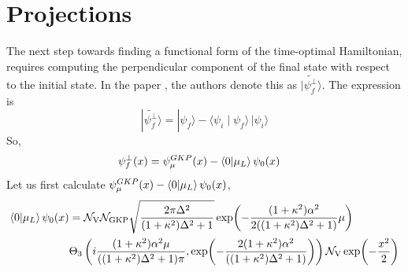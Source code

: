 \documentclass[11pt]{article}
\begin{document}
\section{Projections}
The next step towards finding a functional form of the time-optimal Hamiltonian, requires computing the perpendicular component of the final state with respect to the initial state. In the paper \cite{yang2022MinimumTime}, the authors denote this as $|\tilde{\psi_f^{\perp}}\rangle$. The expression is
\[
    |\tilde{\psi_f^{\perp}}\rangle
    =
    |\psi_f\rangle
    -
    \langle \psi_i \mid \psi_f \rangle \, |\psi_i\rangle
\]
So,
\begin{align*}
    \psi_f^{\perp}(x) & = \psi_{\mu}^{GKP}(x) - \braket{0}{\mu_L} \psi_0(x)
\end{align*}
Let us first calculate $\psi_{\mu}^{GKP}(x) - \braket{0}{\mu_L} \psi_0(x)$,
\begin{align*}
    \braket{0}{\mu_L} \psi_0(x)
     & =
    \mathcal{N}_{\mathrm{V}} \mathcal{N}_{\mathrm{GKP}} \sqrt{\frac{2\pi\Delta^2}{(1 + \kappa^2)\Delta^2 + 1}}  \exp\!\left(-\frac{(1 + \kappa^2)\alpha^2}{2((1 + \kappa^2)\Delta^2 + 1)} \mu\right) \\ &\Theta_3\left(i\frac{(1 + \kappa^2)\alpha^2 \mu}{((1 + \kappa^2)\Delta^2 + 1)\pi}, \exp\!\left(-\frac{2(1 + \kappa^2)\alpha^2}{((1 + \kappa^2)\Delta^2 + 1)}\right)\right) \mathcal{N}_{\mathrm{V}} \exp\!\left(-\frac{x^2}{2}\right)
\end{align*}

\section{}

\newpage


\end{document}
